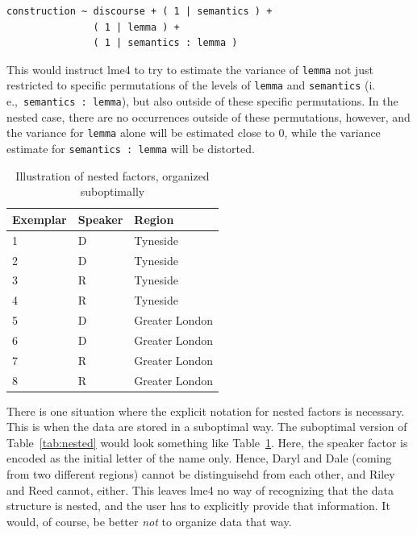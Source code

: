 \documentclass[a4paper,12pt]{article}
\newcommand{\ie}{i.\,e.,\ }
\begin{document}
\vspace{0.5\baselineskip}

\begin{lstlisting}[frame=trbl]
construction ~ discourse + ( 1 | semantics ) +
               ( 1 | lemma ) +
               ( 1 | semantics : lemma )
\end{lstlisting}

This would instruct lme4 to try to estimate the variance of \texttt{lemma} not just restricted to specific permutations of the levels of \texttt{lemma} and \texttt{semantics} (\ie \texttt{semantics : lemma}), but also outside of these specific permutations.
In the nested case, there are no occurrences outside of these permutations, however, and the variance for \texttt{lemma} alone will be estimated close to $0$, while the variance estimate for \texttt{semantics : lemma} will be distorted.

\begin{table}
  \centering
  \begin{tabular}{lll}
    \toprule
    \textbf{Exemplar} & \textbf{Speaker}  & \textbf{Region}        \\
    \midrule
                    1 &           D      &         Tyneside       \\
                    2 &           D      &         Tyneside       \\
                    3 &           R      &         Tyneside       \\
                    4 &           R      &         Tyneside       \\
                    5 &           D      &         Greater London \\
                    6 &           D      &         Greater London \\
                    7 &           R      &         Greater London \\
                    8 &           R      &         Greater London \\
    \bottomrule
  \end{tabular}
  \caption{Illustration of nested factors, organized suboptimally}
  \label{tab:nestedwrong}
\end{table}

There is one situation where the explicit notation for nested factors is necessary.
This is when the data are stored in a suboptimal way.
The suboptimal version of Table~\ref{tab:nested} would look something like Table~\ref{tab:nestedwrong}.
Here, the speaker factor is encoded as the initial letter of the name only.
Hence, Daryl and Dale (coming from two different regions) cannot be distinguisehd from each other, and Riley and Reed cannot, either.
This leaves lme4 no way of recognizing that the data structure is nested, and the user has to explicitly provide that information.
It would, of course, be better \textit{not} to organize data that way.
\end{document}
